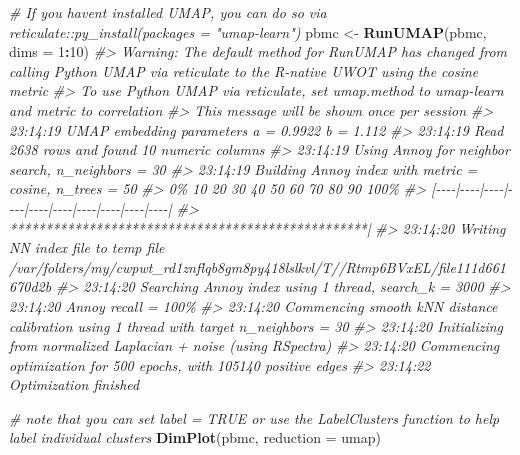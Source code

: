 \documentclass[
]{book}
\newenvironment{Shaded}{\begin{snugshade}}{\end{snugshade}}
\newcommand{\AttributeTok}[1]{\textcolor[rgb]{0.13,0.29,0.53}{#1}}
\newcommand{\CommentTok}[1]{\textcolor[rgb]{0.56,0.35,0.01}{\textit{#1}}}
\newcommand{\DecValTok}[1]{\textcolor[rgb]{0.00,0.00,0.81}{#1}}
\newcommand{\FunctionTok}[1]{\textcolor[rgb]{0.13,0.29,0.53}{\textbf{#1}}}
\newcommand{\NormalTok}[1]{#1}
\newcommand{\OtherTok}[1]{\textcolor[rgb]{0.56,0.35,0.01}{#1}}
\newcommand{\SpecialCharTok}[1]{\textcolor[rgb]{0.81,0.36,0.00}{\textbf{#1}}}
\newcommand{\StringTok}[1]{\textcolor[rgb]{0.31,0.60,0.02}{#1}}
\begin{document}
\begin{Shaded}
\begin{Highlighting}[]
\CommentTok{\# If you haven\textquotesingle{}t installed UMAP, you can do so via reticulate::py\_install(packages = "umap{-}learn")}
\NormalTok{pbmc }\OtherTok{\textless{}{-}} \FunctionTok{RunUMAP}\NormalTok{(pbmc, }\AttributeTok{dims =} \DecValTok{1}\SpecialCharTok{:}\DecValTok{10}\NormalTok{)}
\CommentTok{\#\textgreater{} Warning: The default method for RunUMAP has changed from calling Python UMAP via reticulate to the R{-}native UWOT using the cosine metric}
\CommentTok{\#\textgreater{} To use Python UMAP via reticulate, set umap.method to \textquotesingle{}umap{-}learn\textquotesingle{} and metric to \textquotesingle{}correlation\textquotesingle{}}
\CommentTok{\#\textgreater{} This message will be shown once per session}
\CommentTok{\#\textgreater{} 23:14:19 UMAP embedding parameters a = 0.9922 b = 1.112}
\CommentTok{\#\textgreater{} 23:14:19 Read 2638 rows and found 10 numeric columns}
\CommentTok{\#\textgreater{} 23:14:19 Using Annoy for neighbor search, n\_neighbors = 30}
\CommentTok{\#\textgreater{} 23:14:19 Building Annoy index with metric = cosine, n\_trees = 50}
\CommentTok{\#\textgreater{} 0\%   10   20   30   40   50   60   70   80   90   100\%}
\CommentTok{\#\textgreater{} [{-}{-}{-}{-}|{-}{-}{-}{-}|{-}{-}{-}{-}|{-}{-}{-}{-}|{-}{-}{-}{-}|{-}{-}{-}{-}|{-}{-}{-}{-}|{-}{-}{-}{-}|{-}{-}{-}{-}|{-}{-}{-}{-}|}
\CommentTok{\#\textgreater{} **************************************************|}
\CommentTok{\#\textgreater{} 23:14:20 Writing NN index file to temp file /var/folders/my/cwpwt\_rd1znflqb8gm8py418lslkvl/T//Rtmp6BVxEL/file111d661670d2b}
\CommentTok{\#\textgreater{} 23:14:20 Searching Annoy index using 1 thread, search\_k = 3000}
\CommentTok{\#\textgreater{} 23:14:20 Annoy recall = 100\%}
\CommentTok{\#\textgreater{} 23:14:20 Commencing smooth kNN distance calibration using 1 thread with target n\_neighbors = 30}
\CommentTok{\#\textgreater{} 23:14:20 Initializing from normalized Laplacian + noise (using RSpectra)}
\CommentTok{\#\textgreater{} 23:14:20 Commencing optimization for 500 epochs, with 105140 positive edges}
\CommentTok{\#\textgreater{} 23:14:22 Optimization finished}
\end{Highlighting}
\end{Shaded}

\begin{Shaded}
\begin{Highlighting}[]
\CommentTok{\# note that you can set \textasciigrave{}label = TRUE\textasciigrave{} or use the LabelClusters function to help label individual clusters}
\FunctionTok{DimPlot}\NormalTok{(pbmc, }\AttributeTok{reduction =} \StringTok{\textquotesingle{}umap\textquotesingle{}}\NormalTok{)}
\end{Highlighting}
\end{Shaded}
\end{document}
